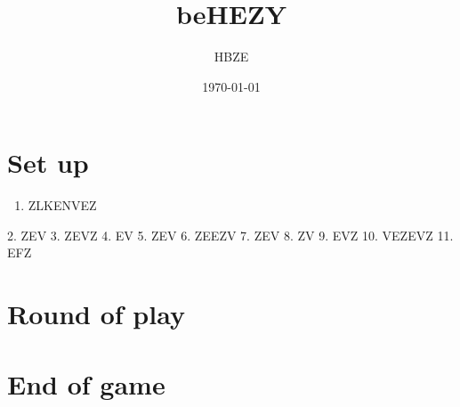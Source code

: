 \documentclass{article}%
\title{beHEZY}%
\author{HBZE}%
\date{\today}%
\begin{document}
%
\pagestyle{empty}%
\normalsize%
\maketitle%
\section{ Set up
}%
\label{sec:Setup}%
\begin{enumerate}%
\item%
 ZLKENVEZ
%
\end{enumerate}%
2. ZEV
%
3. ZEVZ
%
4. EV
%
5. ZEV
%
6. ZEEZV
%
7. ZEV
%
8. ZV
%
9. EVZ
%
10. VEZEVZ
%
11. EFZ


%
\section{ Round of play
}%
\label{sec:Roundofplay}%

%
\section{ End of game}%
\label{sec:Endofgame}%

%
\end{document}
